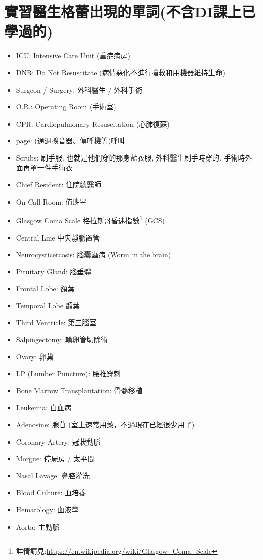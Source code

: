\section{實習醫生格蕾出現的單詞(不含DI課上已學過的)}
\begin{multicols}{2}
\begin{itemize}
  \itemsep0em
  \item ICU: Intensive Care Unit (重症病房)
  \item DNR: Do Not Resuscitate (病情惡化不進行搶救和用機器維持生命)
  \item Surgeon / Surgery: 外科醫生 / 外科手術
  \item O.R.: Operating Room (手術室)
  \item CPR: Cardiopulmonary Resuscitation (心肺復蘇)
  \item page: (通過擴音器、傳呼機等)呼叫
  \item Scrubs: 刷手服. 也就是他們穿的那身藍衣服, 外科醫生刷手時穿的, 手術時外面再罩一件手術衣
  \item Chief Resident: 住院總醫師
  \item On Call Room: 值班室
  \item Glasgow Coma Scale 格拉斯哥昏迷指數\footnote{詳情請見:\url{https://en.wikipedia.org/wiki/Glasgow_Coma_Scale}} (GCS)
  \item Central Line 中央靜脈置管
  \item Neurocysticercosis: 腦囊蟲病 (Worm in the brain)
  \item Pituitary Gland: 腦垂體
  \item Frontal Lobe: 額葉
  \item Temporal Lobe 顳葉
  \item Third Ventricle: 第三腦室
  \item Salpingectomy: 輸卵管切除術
  \item Ovary: 卵巢
  \item LP (Lumber Puncture): 腰椎穿刺
  \item Bone Marrow Transplantation: 骨髓移植
  \item Leukemia: 白血病
  \item Adenosine: 腺苷 (室上速常用藥，不過現在已經很少用了)
  \item Coronary Artery: 冠狀動脈
  \item Morgue: 停屍房 / 太平間
  \item Nasal Lavage: 鼻腔灌洗
  \item Blood Culture: 血培養
  \item Hematology: 血液學
  \item Aorta: 主動脈

\end{itemize}
\end{multicols}
